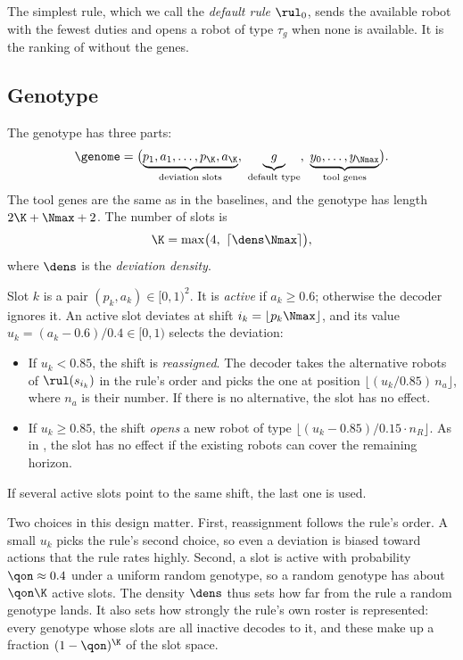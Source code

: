 The simplest rule, which we call the \emph{default rule} $\rul_0$, sends the available robot with the fewest duties and opens a robot of type $\tau_g$ when none is available.
It is the ranking of  without the genes.

\subsection{Genotype}
\label{sec:method:genotype}

The genotype has three parts:
\begin{equation}
  \genome = \bigl(\underbrace{p_1, a_1, \dots, p_\K, a_\K}_{\text{deviation slots}},\ \underbrace{g}_{\text{default type}},\ \underbrace{y_0, \dots, y_{\Nmax}}_{\text{tool genes}}\bigr).
\end{equation}
The tool genes are the same as in the baselines, and the genotype has length $2\K + \Nmax + 2$.
The number of slots is
\begin{equation}
  \K = \max\bigl(4,\ \lceil \dens \Nmax \rceil\bigr),
\end{equation}
where $\dens$ is the \emph{deviation density}.

Slot $k$ is a pair $(p_k, a_k) \in [0,1)^2$.
It is \emph{active} if $a_k \ge 0.6$; otherwise the decoder ignores it.
An active slot deviates at shift $i_k = \lfloor p_k \Nmax \rfloor$, and its value $u_k = (a_k - 0.6)/0.4 \in [0,1)$ selects the deviation:
\begin{itemize}
  \item If $u_k < 0.85$, the shift is \emph{reassigned}.
  The decoder takes the alternative robots of $\rul(s_{i_k})$ in the rule's order and picks the one at position $\lfloor (u_k/0.85)\,n_a \rfloor$, where $n_a$ is their number.
  If there is no alternative, the slot has no effect.
  \item If $u_k \ge 0.85$, the shift \emph{opens} a new robot of type $\lfloor (u_k - 0.85)/0.15 \cdot n_R \rfloor$.
  As in , the slot has no effect if the existing robots can cover the remaining horizon.
\end{itemize}
If several active slots point to the same shift, the last one is used.

Two choices in this design matter.
First, reassignment follows the rule's order. A small $u_k$ picks the rule's second choice, so even a deviation is biased toward actions that the rule rates highly.
Second, a slot is active with probability $\qon \approx 0.4$ under a uniform random genotype, so a random genotype has about $\qon \K$ active slots.
The density $\dens$ thus sets how far from the rule a random genotype lands.
It also sets how strongly the rule's own roster is represented: every genotype whose slots are all inactive decodes to it, and these make up a fraction $(1-\qon)^\K$ of the slot space.


